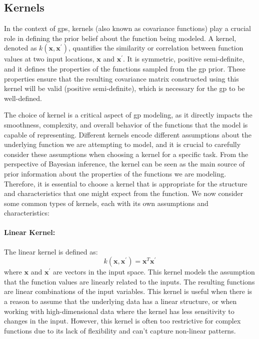 \subsection{Kernels}
\label{section:kernels}
In the context of \acfp{gp}, kernels (also known as covariance functions) play a crucial role in defining the prior belief about the function being modeled. A kernel, denoted as $k(\mathbf{x}, \mathbf{x}^\prime)$, quantifies the similarity or correlation between function values at two input locations, $\mathbf{x}$ and $\mathbf{x}^\prime$. It is symmetric, positive semi-definite, and it defines the properties of the functions sampled from the \ac{gp} prior. These properties ensure that the resulting covariance matrix constructed using this kernel will be valid (positive semi-definite), which is necessary for the \ac{gp} to be well-defined.

The choice of kernel is a critical aspect of \ac{gp} modeling, as it directly impacts the smoothness, complexity, and overall behavior of the functions that the model is capable of representing. Different kernels encode different assumptions about the underlying function we are attempting to model, and it is crucial to carefully consider these assumptions when choosing a kernel for a specific task. From the perspective of Bayesian inference, the kernel can be seen as the main source of prior information about the properties of the functions we are modeling. Therefore, it is essential to choose a kernel that is appropriate for the structure and characteristics that one might expect from the function. We now consider some common types of kernels, each with its own assumptions and characteristics:

\paragraph{Linear Kernel:}
The linear kernel is defined as:
\[k(\mathbf{x}, \mathbf{x}^\prime) = \mathbf{x}^T \mathbf{x}^\prime\]
where $\mathbf{x}$ and $\mathbf{x}^\prime$ are vectors in the input space. This kernel models the assumption that the function values are linearly related to the inputs. The resulting functions are linear combinations of the input variables. This kernel is useful when there is a reason to assume that the underlying data has a linear structure, or when working with high-dimensional data where the kernel has less sensitivity to changes in the input. However, this kernel is often too restrictive for complex functions due to its lack of flexibility and can't capture non-linear patterns. 

